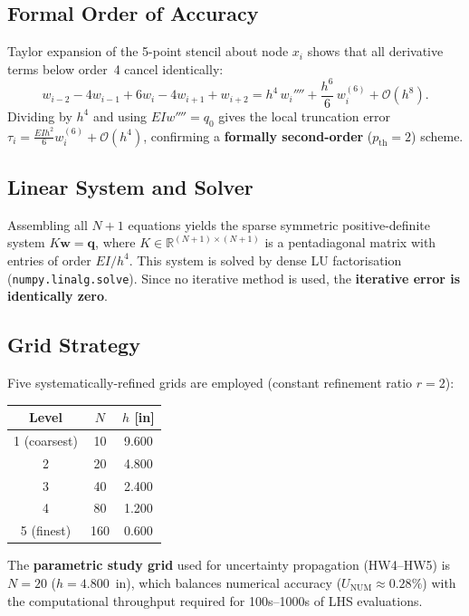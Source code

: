 \documentclass[11pt,letterpaper]{article}
\newcommand{\EI}{EI}
\begin{document}
\subsection{Formal Order of Accuracy}

Taylor expansion of the 5-point stencil about node $x_i$ shows that all
derivative terms below order~4 cancel identically:
\begin{equation}
  w_{i-2} - 4w_{i-1} + 6w_i - 4w_{i+1} + w_{i+2}
  = h^4\,w_i'''' + \frac{h^6}{6}\,w_i^{(6)} + \mathcal{O}(h^8).
\end{equation}
Dividing by $h^4$ and using $\EI w'''' = q_0$ gives the local truncation error
$\tau_i = \frac{\EI h^2}{6} w_i^{(6)} + \mathcal{O}(h^4)$, confirming a
\textbf{formally second-order} ($p_{\mathrm{th}} = 2$) scheme.

\subsection{Linear System and Solver}

Assembling all $N+1$ equations yields the sparse symmetric positive-definite
system $K\mathbf{w} = \mathbf{q}$, where $K \in \mathbb{R}^{(N+1)\times(N+1)}$
is a pentadiagonal matrix with entries of order $\EI/h^4$.
This system is solved by dense LU factorisation (\texttt{numpy.linalg.solve}).
Since no iterative method is used, the \textbf{iterative error is identically zero}.

\subsection{Grid Strategy}

Five systematically-refined grids are employed (constant refinement ratio $r = 2$):

\begin{center}
\begin{tabular}{ccc}
  \toprule
  Level & $N$ & $h$ [in] \\
  \midrule
  1 (coarsest) & 10  & 9.600 \\
  2            & 20  & 4.800 \\
  3            & 40  & 2.400 \\
  4            & 80  & 1.200 \\
  5 (finest)   & 160 & 0.600 \\
  \bottomrule
\end{tabular}
\end{center}

The \textbf{parametric study grid} used for uncertainty propagation (HW4--HW5)
is $N = 20$ ($h = 4.800$~in), which balances numerical accuracy
($U_{\mathrm{NUM}} \approx 0.28\%$) with the computational throughput required
for 100s--1000s of LHS evaluations.
\end{document}
